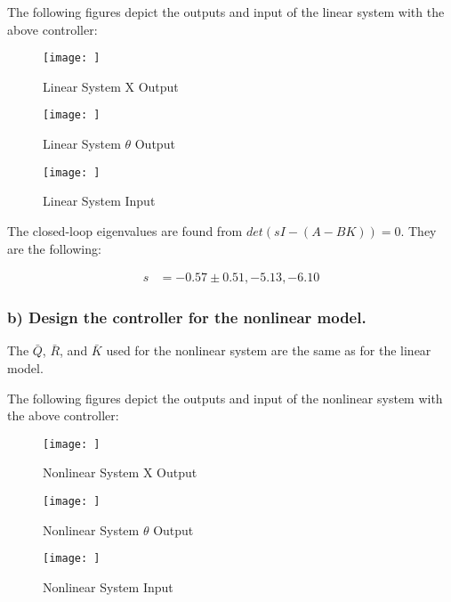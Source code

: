 The following figures depict the outputs and input of the linear system with the above controller:

\begin{figure}[!ht]
    \centering
    \texttt{[image: ]}
    \caption{Linear System X Output}
    \label{}
\end{figure}

\begin{figure}[!ht]
    \centering
    \texttt{[image: ]}
    \caption{Linear System $\theta$ Output}
    \label{}
\end{figure}

\begin{figure}[!ht]
    \centering
    \texttt{[image: ]}
    \caption{Linear System Input}
    \label{}
\end{figure}

\clearpage

The closed-loop eigenvalues are found from $det(sI-(A-BK))=0$. They are the following:

\begin{equation*}
    \begin{split}
        s & = -0.57\pm0.51, -5.13, -6.10
    \end{split}
\end{equation*}

\subsubsection*{b) Design the controller for the nonlinear model.}

The $\bar{Q}$, $\bar{R}$, and $\bar{K}$ used for the nonlinear system are the same as for the linear model.

The following figures depict the outputs and input of the nonlinear system with the above controller:

\begin{figure}[!ht]
    \centering
    \texttt{[image: ]}
    \caption{Nonlinear System X Output}
    \label{}
\end{figure}

\begin{figure}[!ht]
    \centering
    \texttt{[image: ]}
    \caption{Nonlinear System $\theta$ Output}
    \label{}
\end{figure}

\begin{figure}[!ht]
    \centering
    \texttt{[image: ]}
    \caption{Nonlinear System Input}
    \label{}
\end{figure}


